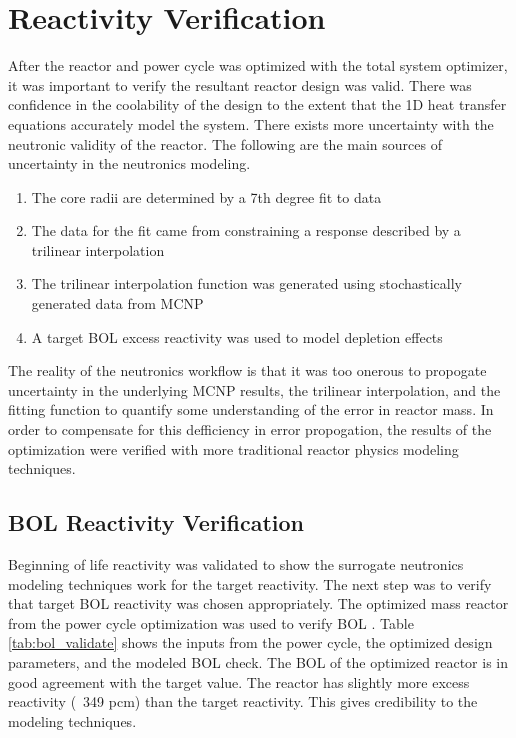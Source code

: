 \section{Reactivity Verification}
After the reactor and power cycle was optimized with the total system optimizer,
it was important to verify the resultant reactor design was valid. There was
confidence in the coolability of the design to the extent that the 1D heat
transfer equations accurately model the system. There exists more uncertainty
with the neutronic validity of the reactor. The following are the main sources
of uncertainty in the neutronics modeling.

\onehalfspacing
\begin{enumerate}
    \item The core radii are determined by a 7th degree fit to data
    \item The data for the fit came from constraining a \keff response described
        by a trilinear interpolation
    \item The trilinear interpolation function was generated using stochastically
        generated \keff data from MCNP
    \item A target BOL excess reactivity was used to model depletion effects
\end{enumerate}
\doublespacing

The reality of the neutronics workflow is that it was too onerous to propogate
uncertainty in the underlying MCNP results, the trilinear interpolation, and the
fitting function to quantify some understanding of the error in reactor mass. In
order to compensate for this defficiency in error propogation, the results of
the optimization were verified with more traditional reactor physics modeling
techniques.

\subsection{BOL Reactivity Verification}
Beginning of life reactivity was validated to show the surrogate neutronics
modeling techniques work for the target reactivity. The next step was to verify
that target BOL reactivity was chosen appropriately. The optimized mass reactor
from the power cycle optimization was used to verify BOL \keff. Table
\ref{tab:bol_validate} shows the inputs from the power cycle, the optimized
design parameters, and the modeled BOL \keff check. The BOL \keff of the optimized reactor
is in good agreement with the target value. 
The reactor has slightly more excess reactivity (~349 pcm) than the
target reactivity. This gives credibility to the \keff modeling techniques.

